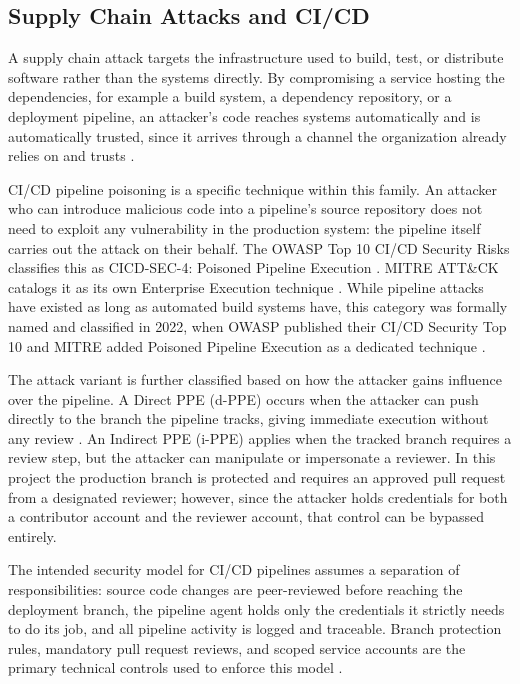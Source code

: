 \documentclass{article}
\begin{document}
\subsection{Supply Chain Attacks and CI/CD}

A supply chain attack targets the infrastructure used to build, test, or distribute software rather than the systems directly. By compromising a service hosting the dependencies, for example a build system, a dependency repository, or a deployment pipeline, an attacker's code reaches systems automatically and is automatically trusted, since it arrives through a channel the organization already relies on and trusts \cite{owaspPPE}.

CI/CD pipeline poisoning is a specific technique within this family. An attacker who can introduce malicious code into a pipeline's source repository does not need to exploit any vulnerability in the production system: the pipeline itself carries out the attack on their behalf. The OWASP Top 10 CI/CD Security Risks classifies this as CICD-SEC-4: Poisoned Pipeline Execution \cite{owaspPPE}. MITRE ATT\&CK catalogs it as its own Enterprise Execution technique \cite{mitrePoisonedPipeline}. While pipeline attacks have existed as long as automated build systems have, this category was formally named and classified in 2022, when OWASP published their CI/CD Security Top 10 \cite{owaspPPE} and MITRE added Poisoned Pipeline Execution as a dedicated technique \cite{mitrePoisonedPipeline}.

The attack variant is further classified based on how the attacker gains influence over the pipeline. A Direct PPE (d-PPE) occurs when the attacker can push directly to the branch the pipeline tracks, giving immediate execution without any review \cite{bishopFoxPPE}. An Indirect PPE (i-PPE) applies when the tracked branch requires a review step, but the attacker can manipulate or impersonate a reviewer. In this project the production branch is protected and requires an approved pull request from a designated reviewer; however, since the attacker holds credentials for both a contributor account and the reviewer account, that control can be bypassed entirely.

The intended security model for CI/CD pipelines assumes a separation of responsibilities: source code changes are peer-reviewed before reaching the deployment branch, the pipeline agent holds only the credentials it strictly needs to do its job, and all pipeline activity is logged and traceable. Branch protection rules, mandatory pull request reviews, and scoped service accounts are the primary technical controls used to enforce this model \cite{owaspPPE5}.
\end{document}
